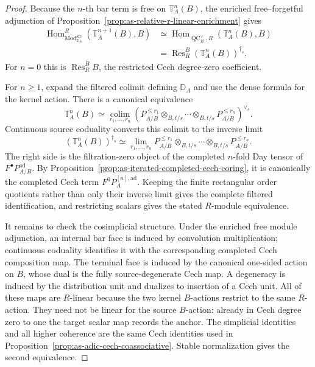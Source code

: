 \begin{proof}
Because the $n$-th bar term is free on $\mathbb T_A^n(B)$, the enriched
free--forgetful adjunction of
Proposition~\ref{prop:as-relative-r-linear-enrichment} gives
\[
\begin{aligned}
    \underline{\operatorname{Hom}}^R_{
        \operatorname{Mod}^{\mathrm{src}}_{\mathbb D_A}}
    \left(
        \mathbb T_A^{n+1}(B),
        B
    \right)
    &\simeq
    \underline{\operatorname{Hom}}_{\operatorname{QC}^{\vee}_B,R}
    \left(
        \mathbb T_A^n(B),
        B
    \right)\\
    &=
    \operatorname{Res}_R^B
    \left(\mathbb T_A^n(B)\right)^{\dagger_s}.
\end{aligned}
\]
For $n=0$ this is $\operatorname{Res}_R^B B$, the restricted Cech
degree-zero coefficient.

For $n\geq1$, expand the filtered colimit defining $\mathbb D_A$ and use the
dense formula for the kernel action.  There is a canonical equivalence
\[
\mathbb T_A^n(B)
\simeq
\operatorname*{colim}_{r_1,\ldots,r_n}
\left(
    P_{A/B}^{\le r_1}
    \otimes_{B,t/s}\cdots\otimes_{B,t/s}
    P_{A/B}^{\le r_n}
\right)^{\vee_s}.
\]
Continuous source coduality converts this colimit to the inverse limit
\[
\left(\mathbb T_A^n(B)\right)^{\dagger_s}
\simeq
\lim_{r_1,\ldots,r_n}
P_{A/B}^{\le r_1}
\otimes_{B,t/s}\cdots\otimes_{B,t/s}
P_{A/B}^{\le r_n}.
\]
The right side is the filtration-zero object of the completed $n$-fold Day
tensor of $F^\bullet P_{A/B}^{\mathrm{ad}}$.  By
Proposition~\ref{prop:as-iterated-completed-cech-coring}, it is canonically
the completed Cech term $F^0P_A^{[n],\mathrm{ad}}$.  Keeping the finite
rectangular order quotients rather than only their inverse limit gives the
complete filtered identification, and restricting scalars gives the stated
$R$-module equivalence.

It remains to check the cosimplicial structure.  Under the enriched free
module adjunction, an internal bar face is induced by convolution
multiplication; continuous coduality identifies it with the corresponding
completed Cech composition map.  The terminal face is induced by the
canonical one-sided action on $B$, whose dual is the fully source-degenerate
Cech map.  A degeneracy is induced by the distribution unit and dualizes to
insertion of a Cech unit.  All of these maps are $R$-linear because the two
kernel $B$-actions restrict to the same $R$-action.  They need not be linear
for the source $B$-action: already in Cech degree zero to one the target
scalar map records the anchor.  The simplicial identities and all higher
coherence are the same Cech identities used in
Proposition~\ref{prop:as-adic-cech-coassociative}.  Stable normalization gives
the second equivalence.
\end{proof}

